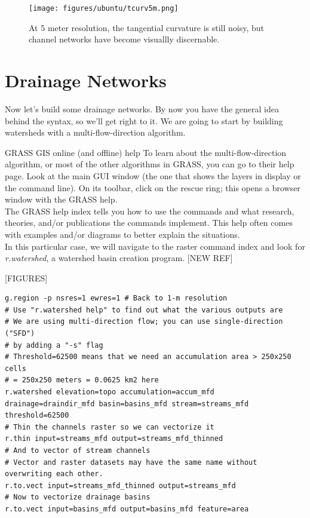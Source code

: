 \documentclass{book}
\begin{document}
\begin{figure}[h]
 \begin{center}
 \texttt{[image: figures/ubuntu/tcurv5m.png]}
 \caption{At 5 meter resolution, the tangential curvature is still noisy, but channel networks have become visuallly discernable.}
 \label{fig:tcurv5m}
 \end{center}
\end{figure}


\section{Drainage Networks \label{s:drainage_networks}}

Now let's build some drainage networks. By now you have the general idea behind the syntax, so we'll get right to it. We are going to start by building watersheds with a multi-flow-direction algorithm.

\begin{boxx}[!ht]
\begin{bclogo}[arrondi = 0.1, logo = \bcrosevents]{GRASS GIS online (and offline) help}
To learn about the multi-flow-direction algorithm, or most of the other algorithms in GRASS, you can go to their help page. Look at the main GUI window (the one that shows the layers in display or the command line). On its toolbar, click on the rescue ring; this opens a browser window with the GRASS help. \\

The GRASS help index tells you how to use the commands and what research, theories, and/or publications the commands implement. This help often comes with examples and/or diagrams to better explain the situations. \\

In this particular case, we will navigate to the raster command index and look for \emph{r.watershed}, a watershed basin creation program. [NEW REF]
\end{bclogo}
\caption{GRASS GIS online (and offline) help}
\end{boxx}


[FIGURES]

\begin{lstlisting}
g.region -p nsres=1 ewres=1 # Back to 1-m resolution
# Use "r.watershed help" to find out what the various outputs are
# We are using multi-direction flow; you can use single-direction ("SFD")
# by adding a "-s" flag
# Threshold=62500 means that we need an accumulation area > 250x250 cells
# = 250x250 meters = 0.0625 km2 here
r.watershed elevation=topo accumulation=accum_mfd drainage=draindir_mfd basin=basins_mfd stream=streams_mfd threshold=62500
# Thin the channels raster so we can vectorize it
r.thin input=streams_mfd output=streams_mfd_thinned
# And to vector of stream channels
# Vector and raster datasets may have the same name without overwriting each other.
r.to.vect input=streams_mfd_thinned output=streams_mfd
# Now to vectorize drainage basins
r.to.vect input=basins_mfd output=basins_mfd feature=area
\end{lstlisting}
\end{document}
